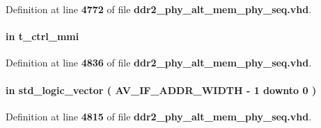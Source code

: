 Definition at line {\bf 4772} of file {\bf ddr2\+\_\+phy\+\_\+alt\+\_\+mem\+\_\+phy\+\_\+seq.\+vhd}.

\paragraph[{ctrl\+\_\+mmi}]{ {\bfseries \textcolor{keywordflow}{in}\textcolor{vhdlchar}{ }} {\bfseries {\bfseries {\bf t\+\_\+ctrl\+\_\+mmi}} \textcolor{vhdlchar}{ }} \hspace{0.3cm}{\ttfamily [Port]}}\label{classddr2__phy__alt__mem__phy__mmi_a2957c0d9ffeb8b20ac868742a94f06ab}


Definition at line {\bf 4836} of file {\bf ddr2\+\_\+phy\+\_\+alt\+\_\+mem\+\_\+phy\+\_\+seq.\+vhd}.

\paragraph[{dbg\+\_\+seq\+\_\+addr}]{ {\bfseries \textcolor{keywordflow}{in}\textcolor{vhdlchar}{ }} {\bfseries \textcolor{comment}{std\+\_\+logic\+\_\+vector}\textcolor{vhdlchar}{ }\textcolor{vhdlchar}{(}\textcolor{vhdlchar}{ }\textcolor{vhdlchar}{ }\textcolor{vhdlchar}{ }\textcolor{vhdlchar}{ }{\bfseries {\bf A\+V\+\_\+\+I\+F\+\_\+\+A\+D\+D\+R\+\_\+\+W\+I\+D\+TH}} \textcolor{vhdlchar}{-\/}\textcolor{vhdlchar}{ } \textcolor{vhdldigit}{1} \textcolor{vhdlchar}{ }\textcolor{keywordflow}{downto}\textcolor{vhdlchar}{ }\textcolor{vhdlchar}{ } \textcolor{vhdldigit}{0} \textcolor{vhdlchar}{ }\textcolor{vhdlchar}{)}\textcolor{vhdlchar}{ }} \hspace{0.3cm}{\ttfamily [Port]}}\label{classddr2__phy__alt__mem__phy__mmi_a2fdcbc0f05f2b2ce0afecf6718af1e7a}


Definition at line {\bf 4815} of file {\bf ddr2\+\_\+phy\+\_\+alt\+\_\+mem\+\_\+phy\+\_\+seq.\+vhd}.

